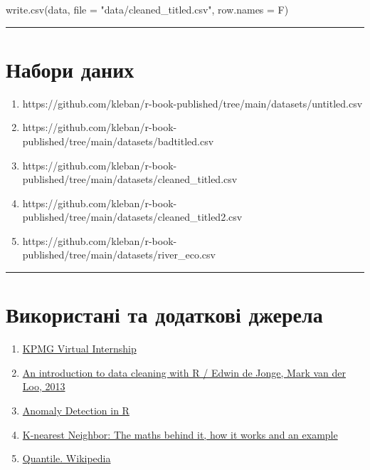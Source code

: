 \documentclass[
  letterpaper,
  DIV=11,
  numbers=noendperiod]{scrreprt}
\newenvironment{Shaded}{\begin{snugshade}}{\end{snugshade}}
\newcommand{\AttributeTok}[1]{\textcolor[rgb]{0.40,0.45,0.13}{#1}}
\newcommand{\FunctionTok}[1]{\textcolor[rgb]{0.28,0.35,0.67}{#1}}
\newcommand{\NormalTok}[1]{\textcolor[rgb]{0.00,0.23,0.31}{#1}}
\newcommand{\StringTok}[1]{\textcolor[rgb]{0.13,0.47,0.30}{#1}}
\providecommand{\tightlist}{%
  \setlength{\itemsep}{0pt}\setlength{\parskip}{0pt}}\usepackage{longtable,booktabs,array}
\begin{document}
\begin{Shaded}
\begin{Highlighting}[]
\FunctionTok{write.csv}\NormalTok{(data, }\AttributeTok{file =} \StringTok{"data/cleaned\_titled.csv"}\NormalTok{, }\AttributeTok{row.names =}\NormalTok{ F)}
\end{Highlighting}
\end{Shaded}

\begin{center}\rule{0.5\linewidth}{0.5pt}\end{center}

\section{Набори
даних}\label{ux43dux430ux431ux43eux440ux438-ux434ux430ux43dux438ux445-9}

\begin{enumerate}
\def\labelenumi{\arabic{enumi}.}
\tightlist
\item
  https://github.com/kleban/r-book-published/tree/main/datasets/untitled.csv
\item
  https://github.com/kleban/r-book-published/tree/main/datasets/badtitled.csv
\item
  https://github.com/kleban/r-book-published/tree/main/datasets/cleaned\_titled.csv
\item
  https://github.com/kleban/r-book-published/tree/main/datasets/cleaned\_titled2.csv
\item
  https://github.com/kleban/r-book-published/tree/main/datasets/river\_eco.csv
\end{enumerate}

\begin{center}\rule{0.5\linewidth}{0.5pt}\end{center}

\section{Використані та додаткові
джерела}\label{ux432ux438ux43aux43eux440ux438ux441ux442ux430ux43dux456-ux442ux430-ux434ux43eux434ux430ux442ux43aux43eux432ux456-ux434ux436ux435ux440ux435ux43bux430-2}

\begin{enumerate}
\def\labelenumi{\arabic{enumi}.}
\tightlist
\item
  \href{https://www.insidesherpa.com/virtual-internships/m7W4GMqeT3bh9Nb2c}{KPMG
  Virtual Internship}
\item
  \href{https://cran.r-project.org/doc/contrib/de_Jonge+van_der_Loo-Introduction_to_data_cleaning_with_R.pdf}{An
  introduction to data cleaning with R / Edwin de Jonge, Mark van der
  Loo, 2013}
\item
  \href{datacamp.com/courses/anomaly-detection-in-r}{Anomaly Detection
  in R}
\item
  \href{https://medium.com/analytics-vidhya/k-nearest-neighbor-the-maths-behind-it-how-it-works-and-an-example-f1de1208546c}{K-nearest
  Neighbor: The maths behind it, how it works and an example}
\item
  \href{https://en.wikipedia.org/wiki/Quantile}{Quantile. Wikipedia}
\end{enumerate}
\end{document}
